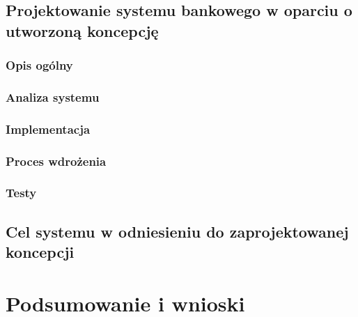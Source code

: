 \section{Projektowanie systemu bankowego w oparciu o utworzoną koncepcję}
\subsection{Opis ogólny}
\subsection{Analiza systemu}
\subsection{Implementacja}
\subsection{Proces wdrożenia}
\subsection{Testy}
\section{Cel systemu w odniesieniu do zaprojektowanej koncepcji}
\chapter{Podsumowanie i wnioski}

